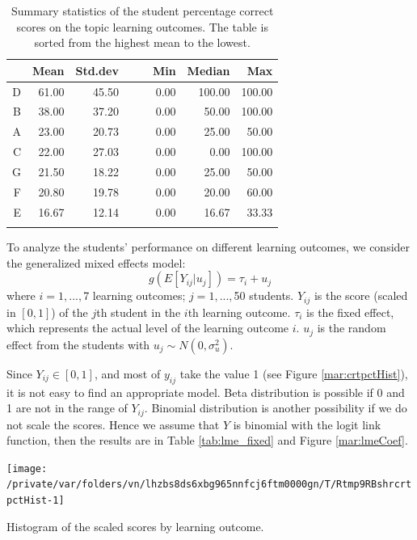 \documentclass[12pt,english,nohyper]{tufte-handout}\usepackage[]{graphicx}\usepackage[]{color}
\newenvironment{knitrout}{}{} %
\begin{document}
\begin{longtable}{rrrllrrr}
  \hline
 & Mean & Std.dev &   &   & Min & Median & Max \\ 
  \hline
D & 61.00 & 45.50 &  &  & 0.00 & 100.00 & 100.00 \\ 
  B & 38.00 & 37.20 &  &  & 0.00 & 50.00 & 100.00 \\ 
  A & 23.00 & 20.73 &  &  & 0.00 & 25.00 & 50.00 \\ 
  C & 22.00 & 27.03 &  &  & 0.00 & 0.00 & 100.00 \\ 
  G & 21.50 & 18.22 &  &  & 0.00 & 25.00 & 50.00 \\ 
  F & 20.80 & 19.78 &  &  & 0.00 & 20.00 & 60.00 \\ 
  E & 16.67 & 12.14 &  &  & 0.00 & 16.67 & 33.33 \\ 
   \hline
\hline
\caption{Summary statistics of the student percentage correct scores on the topic learning outcomes. The table is sorted from the highest mean to the lowest.} 
\label{tab:LearningObj_summary}
\end{longtable}






To analyze the students' performance on different learning outcomes, we consider the generalized mixed effects model:
\[
g(E[Y_{ij}|u_{j}])= \tau_{i}+u_{j}
\]
where $i=1,...,$7 learning outcomes;
$j=1,...,$50 students. $Y_{ij}$ is the score (scaled in $[0,1]$) of
the $j$th student in the $i$th learning outcome. $\tau_i$ is the fixed effect,
which represents the actual level of the learning outcome $i$.
$u_j$ is the random effect from the students with
$u_{j} \sim N(0,\sigma_{u}^{2})$.

Since $Y_{ij} \in [0,1]$, and most of $y_{ij}$ take the value 1
(see Figure \ref{mar:crtpctHist}), it is not easy to find an appropriate model.
Beta distribution is possible if 0 and 1 are not in the range of $Y_{ij}$.
Binomial distribution is another possibility if we do not scale the scores.
Hence we assume that $Y$ is binomial with the logit link function,
then the results are in Table \ref{tab:lme_fixed} and Figure \ref{mar:lmeCoef}.

\begin{knitrout}
\color{fgcolor}\begin{marginfigure}
\texttt{[image: /private/var/folders/vn/lhzbs8ds6xbg965nnfcj6ftm0000gn/T/Rtmp9RBshrcrtpctHist-1]} \caption[Histogram of the scaled scores by learning outcome]{Histogram of the scaled scores by learning outcome.}\label{mar:crtpctHist}
\end{marginfigure}


\end{knitrout}
\end{document}

